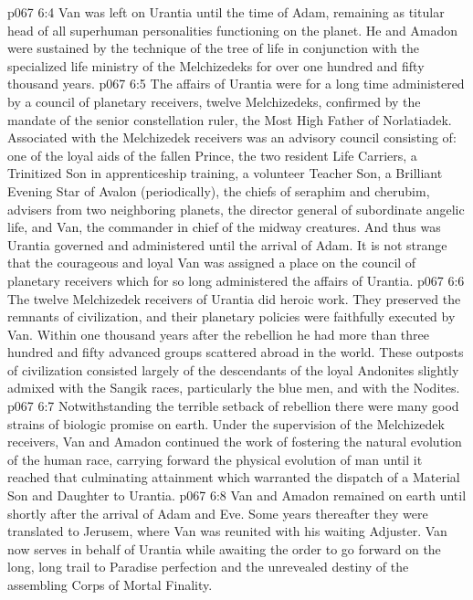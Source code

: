 \vs p067 6:4 Van was left on Urantia until the time of Adam, remaining as titular head of all superhuman personalities functioning on the planet. He and Amadon were sustained by the technique of the tree of life in conjunction with the specialized life ministry of the Melchizedeks for over one hundred and fifty thousand years.
\pc \vs p067 6:5 The affairs of Urantia were for a long time administered by a council of planetary receivers, twelve Melchizedeks, confirmed by the mandate of the senior constellation ruler, the Most High Father of Norlatiadek. Associated with the Melchizedek receivers was an advisory council consisting of: one of the loyal aids of the fallen Prince, the two resident Life Carriers, a Trinitized Son in apprenticeship training, a volunteer Teacher Son, a Brilliant Evening Star of Avalon (periodically), the chiefs of seraphim and cherubim, advisers from two neighboring planets, the director general of subordinate angelic life, and Van, the commander in chief of the midway creatures. And thus was Urantia governed and administered until the arrival of Adam. It is not strange that the courageous and loyal Van was assigned a place on the council of planetary receivers which for so long administered the affairs of Urantia.
\vs p067 6:6 The twelve Melchizedek receivers of Urantia did heroic work. They preserved the remnants of civilization, and their planetary policies were faithfully executed by Van. Within one thousand years after the rebellion he had more than three hundred and fifty advanced groups scattered abroad in the world. These outposts of civilization consisted largely of the descendants of the loyal Andonites slightly admixed with the Sangik races, particularly the blue men, and with the Nodites.
\vs p067 6:7 Notwithstanding the terrible setback of rebellion there were many good strains of biologic promise on earth. Under the supervision of the Melchizedek receivers, Van and Amadon continued the work of fostering the natural evolution of the human race, carrying forward the physical evolution of man until it reached that culminating attainment which warranted the dispatch of a Material Son and Daughter to Urantia.
\pc \vs p067 6:8 Van and Amadon remained on earth until shortly after the arrival of Adam and Eve. Some years thereafter they were translated to Jerusem, where Van was reunited with his waiting Adjuster. Van now serves in behalf of Urantia while awaiting the order to go forward on the long, long trail to Paradise perfection and the unrevealed destiny of the assembling Corps of Mortal Finality.
